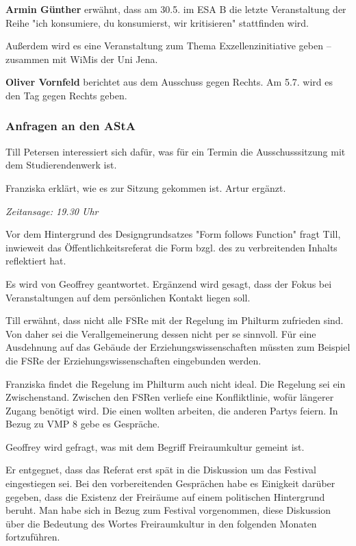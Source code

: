 \documentclass[ngerman,headheight=70pt]{scrartcl}
\begin{document}
    \textbf{Armin Günther} erwähnt, dass am 30.5. im ESA B die letzte Veranstaltung
    der Reihe "ich konsumiere, du konsumierst, wir kritisieren" stattfinden wird.

    Außerdem wird es eine Veranstaltung zum Thema Exzellenzinitiative geben --
    zusammen mit WiMis der Uni Jena.

    \textbf{Oliver Vornfeld} berichtet aus dem Ausschuss gegen Rechts. Am 5.7.
    wird es den Tag gegen Rechts geben.

    \subsubsection{Anfragen an den AStA}

    Till Petersen interessiert sich dafür, was für ein Termin die Ausschusssitzung
    mit dem Studierendenwerk ist.

    Franziska erklärt, wie es zur Sitzung gekommen ist. Artur ergänzt.

    \textit{Zeitansage: 19.30 Uhr}

    Vor dem Hintergrund des Designgrundsatzes "Form follows Function" fragt Till,
    inwieweit das Öffentlichkeitsreferat die Form bzgl. des zu verbreitenden
    Inhalts reflektiert hat.

    Es wird von Geoffrey geantwortet. Ergänzend wird gesagt, dass der Fokus
    bei Veranstaltungen auf dem persönlichen Kontakt liegen soll.

    Till erwähnt, dass nicht alle FSRe mit der Regelung im Philturm zufrieden
    sind. Von daher sei die Verallgemeinerung dessen nicht per se sinnvoll. Für
    eine Ausdehnung auf das Gebäude der Erziehungswissenschaften müssten zum
    Beispiel die FSRe der Erziehungswissenschaften eingebunden werden.

    Franziska findet die Regelung im Philturm auch nicht ideal. Die Regelung sei
    ein Zwischenstand. Zwischen den FSRen verliefe eine Konfliktlinie, wofür längerer
    Zugang benötigt wird. Die einen wollten arbeiten, die anderen Partys feiern.
    In Bezug zu VMP 8 gebe es Gespräche.

    Geoffrey wird gefragt, was mit dem Begriff Freiraumkultur gemeint ist.

    Er entgegnet, dass das Referat erst spät in die Diskussion um das Festival
    eingestiegen sei. Bei den vorbereitenden Gesprächen habe es Einigkeit darüber
    gegeben, dass die Existenz der Freiräume auf einem politischen Hintergrund beruht.
    Man habe sich in Bezug zum Festival vorgenommen, diese Diskussion über die
    Bedeutung des Wortes Freiraumkultur in den folgenden Monaten fortzuführen.
\end{document}
